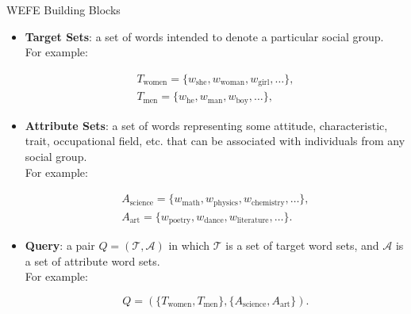 \documentclass[handout]{beamer}
\begin{document}
\begin{frame}{WEFE Building Blocks}
\begin{scriptsize}
\begin{itemize}

 \item \textbf{Target Sets}:  a set of words intended to denote a particular social group. \\ For example:


   \begin{align}
T_{\text{women}}  =  \{w_{\text{she}},w_{\text{woman}},w_{\text{girl}}, \ldots\}, \\
T_{\text{men}}  =  \{w_{\text{he}},w_{\text{man}},w_{\text{boy}}, \ldots\},
 \end{align}


 \item \textbf{Attribute Sets}: a set of words representing some attitude, characteristic, trait, occupational field, etc. that can be associated with individuals from any social group. \\ For example:

    \begin{align}
 A_{\text{science}} =  \{w_{\text{math}},w_{\text{physics}},w_{\text{chemistry}}, \ldots\}, \\
A_{\text{art}} = \{w_{\text{poetry}},w_{\text{dance}},w_{\text{literature}}, \ldots\}.
 \end{align}


  \item \textbf{Query}: a pair $Q=(\mathcal{T},\mathcal{A})$ in which $\mathcal{T}$ is a set of target word sets, and $\mathcal{A}$ is a set of attribute word sets. \\ For example:

 \begin{equation}\label{eq:query}
Q=(\{T_{\text{women}}, T_{\text{men}}\},\{A_{\text{science}},A_{\text{art}}\}).
\end{equation}

 \end{itemize}


\end{scriptsize}
\end{frame}
\end{document}
